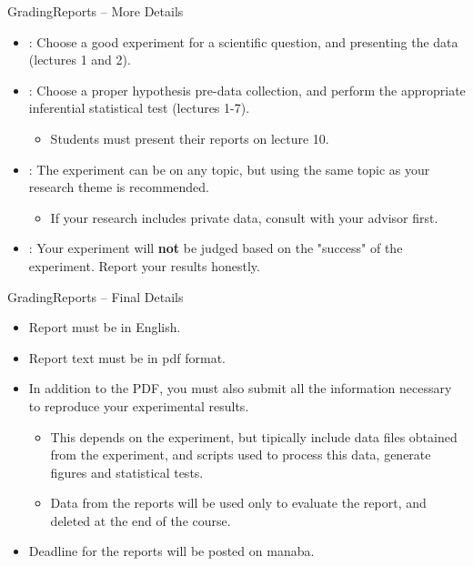 \documentclass[aspectratio=169]{beamer}
\begin{document}
\begin{CJK}{UTF8}{ipxm}
\begin{frame}{Grading}{Reports -- More Details}
  \begin{itemize}
    \item {}: Choose a good experiment for a scientific question, and presenting the data (lectures 1 and 2). \bigskip
    \item {}: Choose a proper hypothesis pre-data collection, and perform the appropriate inferential statistical test (lectures 1-7).
    \begin{itemize}
      \item Students must present their reports on lecture 10.
    \end{itemize}\bigskip
    \item {}: The experiment can be on any topic, but using the same topic as your research theme is recommended.
    \begin{itemize}
      \item If your research includes private data, consult with your advisor first.
    \end{itemize}\bigskip

    \item {}: Your experiment will {\bf not} be judged based on the "success" of the experiment. Report your results honestly.
  \end{itemize}
\end{frame}

\begin{frame}{Grading}{Reports -- Final Details}
  \begin{itemize}
    \item Report must be in English.\bigskip
    \item Report text must be in pdf format.\bigskip
    \item In addition to the PDF, you must also submit all the information necessary to reproduce your experimental results.
    \begin{itemize}
      \item This depends on the experiment, but tipically include data files obtained from the experiment, and scripts used to process this data, generate figures and statistical tests.
      \item Data from the reports will be used only to evaluate the report, and deleted at the end of the course.
    \end{itemize}\bigskip
    \item Deadline for the reports will be posted on manaba.
  \end{itemize}
\end{frame}


\end{CJK}
\end{document}

